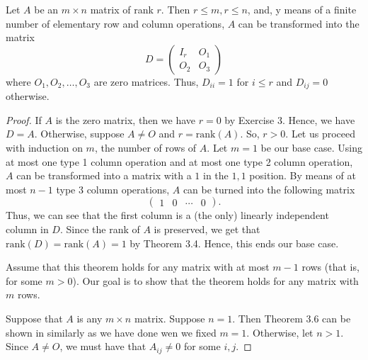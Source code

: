 \begin{theorem}
    Let \( A  \) be an \( m \times n  \) matrix of rank \( r  \). Then \( r \leq m, r \leq n  \), and, y means of a finite number of elementary row and column operations, \( A  \) can be transformed into the matrix 
    \[  D = \begin{pmatrix}
        {I}_{r} & {O}_{1} \\
        {O}_{2} & {O}_{3}
    \end{pmatrix} \]
    where \( {O}_{1}, {O}_{2}, \dots, {O}_{3} \) are zero matrices. Thus, \( {D}_{ii} = 1  \) for \( i \leq r  \) and \( {D}_{ij} = 0  \) otherwise.
\end{theorem}
\begin{proof}
If \( A  \) is the zero matrix, then we have \( r = 0  \) by Exercise 3. Hence, we have \( D = A  \). 
    Otherwise, suppose \( A \neq  O  \) and \( r = \text{rank}(A ) \). So, \( r > 0  \). Let us proceed with induction on \(  m  \), the number of rows of \( A  \). Let \( m = 1  \) be our base case. Using at most one type 1 column operation and at most one type 2 column operation, \( A  \) can be transformed into a matrix with a \( 1  \) in the \( 1,1  \) position. By means of at most \( n - 1  \) type 3 column operations, \( A  \) can be turned into the following matrix
    \[  \begin{pmatrix} 
        1 & 0 & \cdots & 0 
              \end{pmatrix}. \]
              Thus, we can see that the first column is a (the only) linearly independent column in \( D  \). Since the rank of \( A  \) is preserved, we get that \( \text{rank}(D) = \text{rank}(A) = 1  \) by Theorem 3.4. Hence, this ends our base case.

              Assume that this theorem holds for any matrix with at most \( m - 1  \) rows (that is, for some \( m > 0  \)). Our goal is to show that the theorem holds for any matrix with \( m  \) rows.

    Suppose that \( A  \) is any \( m \times n  \) matrix. Suppose \( n = 1  \). Then Theorem 3.6 can be shown in similarly as we have done wen we fixed \(  m =1  \). Otherwise, let \(  n > 1  \). Since \( A \neq O  \), we must have that \( {A}_{ij} \neq 0  \) for some \( i,j  \). 


\end{proof}
